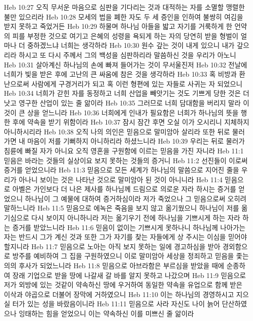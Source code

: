 Heb 10:27  오직 무서운 마음으로 심판을 기다리는 것과 대적하는 자를 소멸할 맹렬한 불만 있으리라
Heb 10:28  모세의 법을 폐한 자도 두 세 증인을 인하여 불쌍히 여김을 받지 못하고 죽었거든
Heb 10:29  하물며 하나님 아들을 밟고 자기를 거룩하게 한 언약의 피를 부정한 것으로 여기고 은혜의 성령을 욕되게 하는 자의 당연히 받을 형벌이 얼마나 더 중하겠느냐 너희는 생각하라
Heb 10:30  원수 갚는 것이 내게 있으니 내가 갚으리라 하시고 또 다시 주께서 그의 백성을 심판하리라 말씀하신 것을 우리가 아노니
Heb 10:31  살아계신 하나님의 손에 빠져 들어가는 것이 무서울진저
Heb 10:32  전날에 너희가 빛을 받은 후에 고난의 큰 싸움에 참은 것을 생각하라
Heb 10:33  혹 비방과 환난으로써 사람에게 구경거리가 되고 혹 이런 형편에 있는 자들로 사귀는 자 되었으니
Heb 10:34  너희가 갇힌 자를 동정하고 너희 산업을 빼앗기는 것도 기쁘게 당한 것은 더 낫고 영구한 산업이 있는 줄 앎이라
Heb 10:35  그러므로 너희 담대함을 버리지 말라 이것이 큰 상을 얻느니라
Heb 10:36  너희에게 인내가 필요함은 너희가 하나님의 뜻을 행한 후에 약속을 받기 위함이라
Heb 10:37  잠시 잠간 후면 오실 이가 오시리니 지체하지 아니하시리라
Heb 10:38  오직 나의 의인은 믿음으로 말미암아 살리라 또한 뒤로 물러가면 내 마음이 저를 기뻐하지 아니하리라 하셨느니라
Heb 10:39  우리는 뒤로 물러가 침륜에 빠질 자가 아니요 오직 영혼을 구원함에 이르는 믿음을 가진 자니라
Heb 11:1  믿음은 바라는 것들의 실상이요 보지 못하는 것들의 증거니
Heb 11:2  선진들이 이로써 증거를 얻었으니라
Heb 11:3  믿음으로 모든 세계가 하나님의 말씀으로 지어진 줄을 우리가 아나니 보이는 것은 나타난 것으로 말미암아 된 것이 아니니라
Heb 11:4  믿음으로 아벨은 가인보다 더 나은 제사를 하나님께 드림으로 의로운 자라 하시는 증거를 얻었으니 하나님이 그 예물에 대하여 증거하심이라 저가 죽었으나 그 믿음으로써 오히려 말하느니라
Heb 11:5  믿음으로 에녹은 죽음을 보지 않고 옮기웠으니 하나님이 저를 옮기심으로 다시 보이지 아니하니라 저는 옮기우기 전에 하나님을 기쁘시게 하는 자라 하는 증거를 받았느니라
Heb 11:6  믿음이 없이는 기쁘시게 못하나니 하나님께 나아가는 자는 반드시 그가 계신 것과 또한 그가 자기를 찾는 자들에게 상 주시는 이심을 믿어야 할지니라
Heb 11:7  믿음으로 노아는 아직 보지 못하는 일에 경고하심을 받아 경외함으로 방주를 예비하여 그 집을 구원하였으니 이로 말미암아 세상을 정죄하고 믿음을 좇는 의의 후사가 되었느니라
Heb 11:8  믿음으로 아브라함은 부르심을 받았을 때에 순종하여 장래 기업으로 받을 땅에 나갈새 갈 바를 알지 못하고 나갔으며
Heb 11:9  믿음으로 저가 외방에 있는 것같이 약속하신 땅에 우거하여 동일한 약속을 유업으로 함께 받은 이삭과 야곱으로 더불어 장막에 거하였으니
Heb 11:10  이는 하나님의 경영하시고 지으실 터가 있는 성을 바랐음이니라
Heb 11:11  믿음으로 사라 자신도 나이 늙어 단산하였으나 잉태하는 힘을 얻었으니 이는 약속하신 이를 미쁘신 줄 앎이라
